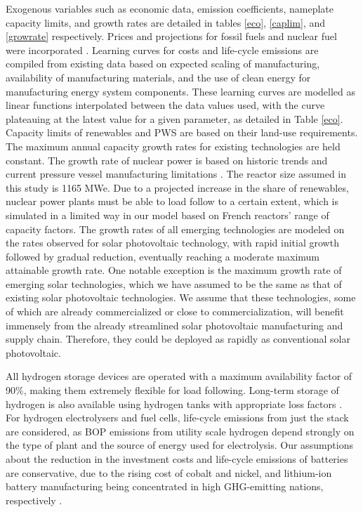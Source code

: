 Exogenous variables such as economic data, emission coefficients, nameplate capacity limits, and growth rates are detailed in tables \ref{eco}, \ref{caplim}, and \ref{growrate} respectively. Prices and projections for fossil fuels and nuclear fuel were incorporated \cite{wittenstein_projected_2015, world_bank_commodity_2016, international_energy_agency_world_2019}. Learning curves for costs and life-cycle emissions are compiled from existing data based on expected scaling of manufacturing, availability of manufacturing materials, and the use of clean energy for manufacturing energy system components. These learning curves are modelled as linear functions interpolated between the data values used, with the curve plateauing at the latest value for a given parameter, as detailed in Table \ref{eco}. Capacity limits of renewables and \gls{PWS} are based on their land-use requirements. The maximum annual capacity growth rates for existing technologies are held constant. The growth rate of nuclear power is based on historic trends and current pressure vessel manufacturing limitations \cite{iaea_pris_nodate}. The reactor size assumed in this study is 1165 MWe. Due to a projected increase in the share of renewables, nuclear power plants must be able to load follow to a certain extent, which is simulated in a limited way in our model based on French reactors' range of capacity factors. The growth rates of all emerging technologies are modeled on the rates observed for solar photovoltaic technology, with rapid initial growth followed by gradual reduction, eventually reaching a moderate maximum attainable growth rate. One notable exception is the maximum growth rate of emerging solar technologies, which we have assumed to be the same as that of existing solar photovoltaic technologies. We assume that these technologies, some of which are already commercialized or close to commercialization, will benefit immensely from the already streamlined solar photovoltaic manufacturing and supply chain. Therefore, they could be deployed as rapidly as conventional solar photovoltaic. 

All hydrogen storage devices are operated with a maximum availability factor of 90\%, making them extremely flexible for load following. Long-term storage of hydrogen is also available using hydrogen tanks with appropriate loss factors \cite{iea_technology_2015}. For hydrogen electrolysers and fuel cells, life-cycle emissions from just the stack are considered, as \gls{BOP} emissions from utility scale hydrogen depend strongly on the type of plant and the source of energy used for electrolysis. Our assumptions about the reduction in the investment costs and life-cycle emissions of batteries are conservative, due to the rising cost of cobalt and nickel, and lithium-ion battery manufacturing being concentrated in high \gls{GHG}-emitting nations, respectively \cite{oliveira_environmental_2015,emilsson_lithium-ion_2019,turcheniuk_ten_2018,simon_potential_2015}. 

